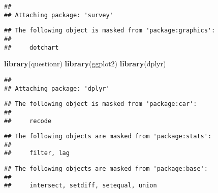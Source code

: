 \documentclass[]{article}
\newenvironment{Shaded}{\begin{snugshade}}{\end{snugshade}}
\newcommand{\KeywordTok}[1]{\textcolor[rgb]{0.13,0.29,0.53}{\textbf{#1}}}
\newcommand{\NormalTok}[1]{#1}
\begin{document}
\begin{verbatim}
## 
## Attaching package: 'survey'
\end{verbatim}

\begin{verbatim}
## The following object is masked from 'package:graphics':
## 
##     dotchart
\end{verbatim}

\begin{Shaded}
\begin{Highlighting}[]
\KeywordTok{library}\NormalTok{(questionr)}
\KeywordTok{library}\NormalTok{(ggplot2)}
\KeywordTok{library}\NormalTok{(dplyr)}
\end{Highlighting}
\end{Shaded}

\begin{verbatim}
## 
## Attaching package: 'dplyr'
\end{verbatim}

\begin{verbatim}
## The following object is masked from 'package:car':
## 
##     recode
\end{verbatim}

\begin{verbatim}
## The following objects are masked from 'package:stats':
## 
##     filter, lag
\end{verbatim}

\begin{verbatim}
## The following objects are masked from 'package:base':
## 
##     intersect, setdiff, setequal, union
\end{verbatim}
\end{document}
